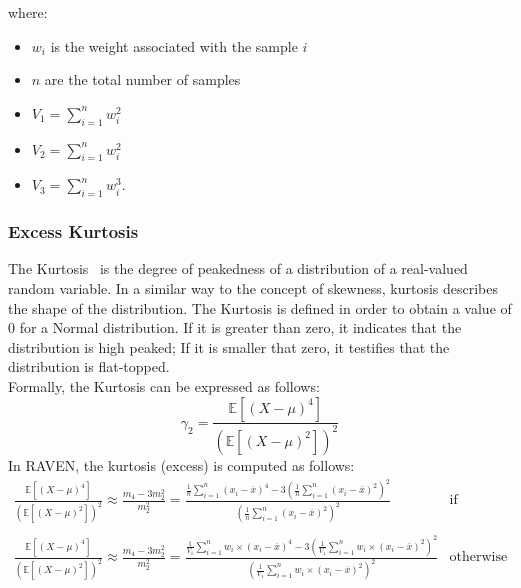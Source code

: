 where:
\begin{itemize}
  \item $w_{i}$ is the weight associated with the sample $i$
  \item $n$ are the total number of samples
  \item $V_{1} = \sum_{i=1}^{n} w_{i}^{2}$
  \item $V_{2} = \sum_{i=1}^{n} w_{i}^{2}$
  \item $V_{3} = \sum_{i=1}^{n} w_{i}^{3}$.
\end{itemize}

\subsubsection{Excess Kurtosis}
The  Kurtosis~\cite{Abramowitz}  is the degree of peakedness of a distribution of a real-valued random variable. In a similar way to the concept of skewness, kurtosis describes the shape of the distribution. The Kurtosis is defined in order to
obtain a value of $0$ for a Normal distribution. If it is greater than zero, it indicates that the distribution is high peaked; If it is smaller 
that zero, it testifies that the distribution is flat-topped.
\\Formally, the Kurtosis can be expressed as follows:
\begin{equation}
\gamma_{2} = \frac{ \mathbb{E}\left [ \left ( X-\mu \right )^{4} \right ]}{\left ( \mathbb{E}\left [ \left ( X-\mu \right )^{2} \right ] \right )^{2}} 
\end{equation}
In RAVEN, the kurtosis (excess) is computed as follows:
\begin{equation}
\begin{matrix}
\frac{ \mathbb{E}\left [ \left ( X-\mu \right )^{4} \right ]}{\left ( \mathbb{E}\left [ \left ( X-\mu \right )^{2} \right ] \right )^{2}}   \approx \frac{m_{4}-3m_{2}^{2}}{m_{2}^{2}} = \displaystyle  \frac{  \frac{1}{n} \sum_{i=1}^{n}  (x_{i} - \overline{x})^{4} -3\left ( \frac{1}{n} \sum_{i=1}^{n}  (x_{i} - \overline{x})^{2} \right )^{2}}{\left ( \frac{1}{n} \sum_{i=1}^{n}  (x_{i} - \overline{x})^{2} \right )^{2}} & \text{if random sampling}    
\\
\\
\frac{ \mathbb{E}\left [ \left ( X-\mu \right )^{4} \right ]}{\left ( \mathbb{E}\left [ \left ( X-\mu \right )^{2} \right ] \right )^{2}}   \approx \frac{m_{4}-3m_{2}^{2}}{m_{2}^{2}} = \displaystyle  \frac{  \frac{1}{V_{1}} \sum_{i=1}^{n} w_{i} \times (x_{i} - \overline{x})^{4} -3\left ( \frac{1}{V_{1}} \sum_{i=1}^{n}  w_{i} \times (x_{i} - \overline{x})^{2} \right )^{2}}{\left ( \frac{1}{V_{1}} \sum_{i=1}^{n}  w_{i} \times (x_{i} - \overline{x})^{2} \right )^{2}} &   \text{otherwise}
\end{matrix}
\end{equation}
